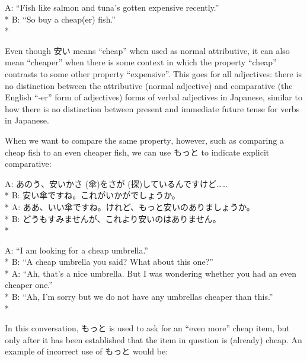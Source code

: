 \documentclass[11pt, b5paper, twoside, openright, onecolumn]{book}
\makeatletter
\newcommand*{\rubystack}[2]{{\relscale{0.5}%
  \begin{tabular}[b]{@{}c@{}}%
    {#1}\\%
   {\textscale{2}{#2}}%
  \end{tabular}}%
}
\DeclareRobustCommand*{\ruby}[2]{%
  \mbox{%
    \setlength{\parskip}{0ex}%
    \BeginAccSupp{method=pdfstringdef,ActualText={#1}}%
      \rubystack{\phantom{#2}}{#1}%
      \llap{%
        \rubystack{#2}{\phantom{#1}}%
      }%
    \EndAccSupp{}%
  }%
}
\renewcommand*{\ruby}[2]{#2 (#1)}%
\newenvironment{exampleblock}{
\setlength{\parindent}{0.6in}
\begin{minipage}[t]{\dimexpr\textwidth-\parindent}}
{\end{minipage}}
\makeatother
\begin{document}
\begin{exampleblock}
A: “Fish like salmon and tuna’s gotten expensive recently.” \\* 
B: “So buy a cheap(er) fish.” \\* 
\end{exampleblock}
\vspace{0.2cm}

Even though 安い means “cheap” when used as normal attributive‚ it can also mean “cheaper” when there is some context in which the property “cheap” contrasts to some other property “expensive”. This goes for all adjectives: there is no distinction between the attributive (normal adjective) and comparative (the English “-er” form of adjectives) forms of verbal adjectives in Japanese‚ similar to how there is no distinction between present and immediate future tense for verbs in Japanese.

When we want to compare the same property‚ however‚ such as comparing a cheap fish to an even cheaper fish‚ we can use もっと to indicate explicit comparative:

\vspace{0.4cm}
\begin{exampleblock}
A: あのう、安い\ruby{傘}{かさ}を\ruby{探}{さが}しているんですけど…… \\* 
B: 安い傘ですね。これがいかがでしょうか。 \\* 
A: ああ、いい傘ですね。けれど、もっと安いのありましょうか。 \\* 
B: どうもすみませんが、これより安いのはありません。 \\* 
\end{exampleblock}
\vspace{0.2cm}

\begin{exampleblock}
A: “I am looking for a cheap umbrella.” \\* 
B: “A cheap umbrella you said? What about this one?” \\* 
A: “Ah‚ that’s a nice umbrella. But I was wondering whether you had an even cheaper one.” \\* 
B: “Ah‚ I’m sorry but we do not have any umbrellas cheaper than this.” \\* 
\end{exampleblock}
\vspace{0.2cm}

In this conversation‚ もっと is used to ask for an “even more” cheap item‚ but only after it has been established that the item in question is (already) cheap. An example of incorrect use of もっと would be:
\end{document}
